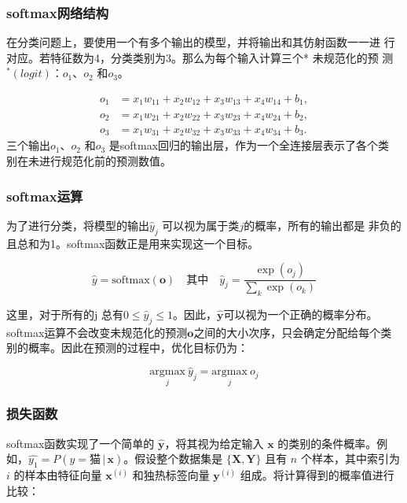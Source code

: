 \documentclass[a4paper,12pt]{article}
\begin{document}
\subsubsection{softmax网络结构}
在分类问题上，要使用一个有多个输出的模型，并将输出和其仿射函数一一进
行对应。若特征数为4，分类类别为3。那么为每个输入计算三个* 未规范化的预
测$^*(logit)$：$o_1$、$o_2$ 和$o_3$。

\begin{equation}
\begin{split}
o_1 &= x_1w_{11} + x_2w_{12} + x_3w_{13} + x_4w_{14} + b_1, \\
o_2 &= x_1w_{21} + x_2w_{22} + x_3w_{23} + x_4w_{24} + b_2, \\
o_3 &= x_1w_{31} + x_2w_{32} + x_3w_{33} + x_4w_{34} + b_3.
\end{split}
\end{equation}
三个输出$o_1$、$o_2$ 和$o_3$ 是softmax回归的输出层，作为一个全连接层表示了各个类
别在未进行规范化前的预测数值。

\subsubsection{softmax运算}
为了进行分类，将模型的输出$\hat{y}_j$ 可以视为属于类$j$的概率，所有的输出都是
非负的且总和为1。softmax函数正是用来实现这一个目标。

\begin{equation}
\hat{y} = \text{softmax}(\mathbf{o}) \quad \text{其中} \quad \hat{y}_j = \frac{\exp(o_j)}{\sum_k \exp(o_k)}
\end{equation}

这里，对于所有的j 总有$0 \leq \hat{y}_j \leq 1$。因此，$\hat{\mathbf{y}}$可以视为一个正确的概率分布。
softmax运算不会改变未规范化的预测$\mathbf{o}$之间的大小次序，只会确定分配给每个类
别的概率。因此在预测的过程中，优化目标仍为：

\begin{equation}
\underset{j}{\mathrm{argmax}} \ \hat{y}_j = \underset{j}{\mathrm{argmax}} \ o_j
\end{equation}

\subsubsection{损失函数}
softmax函数实现了一个简单的 \(\hat{\mathbf{y}}\)，将其视为给定输入 \(\mathbf{x}\) 的类别的条件概率。例如，\(\hat{y_1} = P(y = \text{猫} \, | \, \mathbf{x})\)。假设整个数据集是 \(\{\mathbf{X}, \mathbf{Y}\}\) 且有 \(n\) 个样本，其中索引为 \(i\) 的样本由特征向量 \(\mathbf{x}^{(i)}\) 和独热标签向量 \(\mathbf{y}^{(i)}\) 组成。将计算得到的概率值进行比较：
\end{document}
